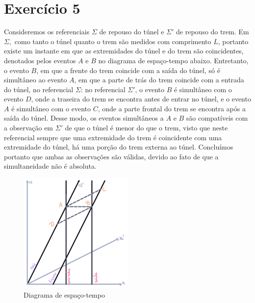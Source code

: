 \section*{Exercício 5}

Consideremos os referenciais \(\Sigma\) de repouso do túnel e \(\Sigma'\) de repouso do trem. Em \(\Sigma,\) como tanto o túnel quanto o trem são medidos com comprimento \(L\), portanto existe um instante em que as extremidades do túnel e do trem são coincidentes, denotados pelos eventos \(A\) e \(B\) no diagrama de espaço-tempo abaixo. Entretanto, o evento \(B\), em que a frente do trem coincide com a saída do túnel, só é simultâneo ao evento \(A\), em que a parte de trás do trem coincide com a entrada do túnel, no referencial \(\Sigma\): no referencial \(\Sigma'\), o evento \(B\) é simultâneo com o evento \(D\), onde a traseira do trem se encontra antes de entrar no túnel, e o evento \(A\) é simultâneo com o evento \(C\), onde a parte frontal do trem se encontra após a saída do túnel. Desse modo, os eventos simultâneos a \(A\) e \(B\) são compatíveis com a observação em \(\Sigma'\) de que o túnel é menor do que o trem, visto que neste referencial sempre que uma extremidade do trem é coincidente com uma extremidade do túnel, há uma porção do trem externa ao túnel. Concluímos portanto que ambas as observações são válidas, devido ao fato de que a simultaneidade não é absoluta.

\begin{figure}[H]
    \centering
    \includegraphics[width=0.5\textwidth]{tunel_trem.png}
    \caption{Diagrama de espaço-tempo}
\end{figure}

